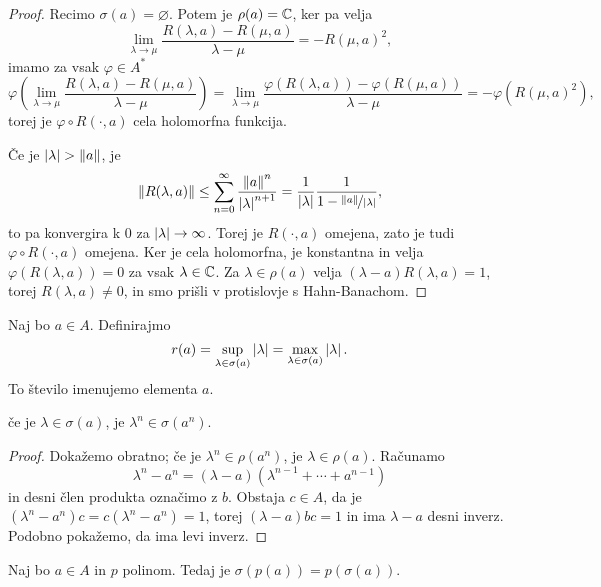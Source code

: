 \begin{proof}
  Recimo $\sigma(a) = \varnothing$.
  Potem je $\rho(a) = \mathbb{C}$, ker pa velja
  \[
	\lim_{\lambda \to \mu} \frac{R(\lambda, a) - R(\mu, a)}{\lambda - \mu} =
	-R(\mu, a)^2,
  \]
  imamo za vsak $\varphi \in A^*$
  \[
	\varphi\!\left( \lim_{\lambda \to \mu} \frac{R(\lambda, a) - R(\mu,
		a)}{\lambda - \mu} \right)
	= \lim_{\lambda \to \mu} \frac{\varphi(R(\lambda, a)) - \varphi(R(\mu,
	  a))}{\lambda - \mu}
	= - \varphi(R(\mu, a)^2),
  \]
  torej je $\varphi \circ R(\cdot, a)$ cela holomorfna funkcija.

  Če je $\left| \lambda \right| > \left\lVert a\right\rVert$, je
  \[
	\left\lVert R(\lambda, a)\right\rVert \le \sum_{n=0}^\infty
	\frac{\left\lVert a\right\rVert^n}{\left| \lambda \right|^{n+1}}
	= \frac{1}{\left| \lambda \right|} \frac{1}{1 - \nicefrac{\left\lVert a\right\rVert}{\left| \lambda \right|}},
  \]
  to pa konvergira k $0$ za $\left| \lambda \right| \to \infty$.
  Torej je $R(\cdot, a)$ omejena, zato je tudi $\varphi \circ R(\cdot, a)$
  omejena.
  Ker je cela holomorfna, je konstantna in velja $\varphi(R(\lambda, a)) = 0$ za
  vsak $\lambda \in \mathbb{C}$.
  Za $\lambda \in \rho(a)$ velja $(\lambda - a)R(\lambda, a) = 1$, torej
  $R(\lambda, a) \ne 0$, in smo prišli v protislovje s Hahn-Banachom.
\end{proof}

\begin{definicija}
  Naj bo $a \in A$.
  Definirajmo
  \[
	r(a) = \sup_{\lambda \in \sigma(a)} \left| \lambda \right| = \max_{\lambda \in
	  \sigma(a)} \left| \lambda \right|.
  \]
  To število imenujemo  elementa $a$.
\end{definicija}

\begin{lema}
  če je $\lambda \in \sigma(a)$, je $\lambda^n \in \sigma(a^n)$.
\end{lema}

\begin{proof}
  Dokažemo obratno; če je $\lambda^n \in \rho(a^n)$, je $\lambda \in \rho(a)$.
  Računamo
  \[
	\lambda^n - a^n = (\lambda -a)(\lambda^{n-1} + \cdots + a^{n-1})
  \]
  in desni člen produkta označimo z $b$.
  Obstaja $c \in A$, da je $(\lambda^n - a^n)c = c(\lambda^n - a^n) =1$, torej
  $(\lambda - a)bc = 1$ in ima $\lambda - a$ desni inverz.
  Podobno pokažemo, da ima levi inverz.
\end{proof}

\begin{trditev}
  Naj bo $a \in A$ in $p$ polinom.
  Tedaj je $\sigma(p(a)) = p(\sigma(a))$.
\end{trditev}

